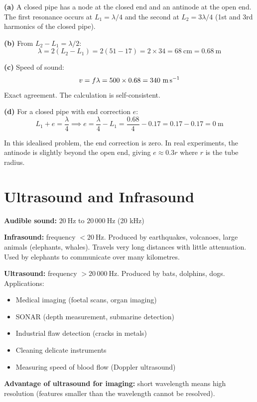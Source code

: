 \begin{solutionbox}
\textbf{(a)} A closed pipe has a node at the closed
end and an antinode at the open end. The first
resonance occurs at $L_1 = \lambda/4$ and the
second at $L_2 = 3\lambda/4$ (1st and 3rd harmonics
of the closed pipe).

\textbf{(b)} From $L_2 - L_1 = \lambda/2$:
\[
  \lambda = 2(L_2 - L_1) = 2(51 - 17)
  = 2 \times 34 = 68\ \text{cm} = 0.68\ \text{m}
\]

\textbf{(c)} Speed of sound:
\[
  v = f\lambda = 500 \times 0.68
  = 340\ \text{m\,s}^{-1}
\]
Exact agreement. The calculation is self-consistent.

\textbf{(d)} For a closed pipe with end correction $e$:
\[
  L_1 + e = \frac{\lambda}{4}
  \implies e = \frac{\lambda}{4} - L_1
  = \frac{0.68}{4} - 0.17 = 0.17 - 0.17 = 0\ \text{m}
\]

In this idealised problem, the end correction is zero.
In real experiments, the antinode is slightly beyond
the open end, giving $e \approx 0.3r$ where $r$ is
the tube radius.
\end{solutionbox}

\section{Ultrasound and Infrasound}

\begin{defbox}
\textbf{Audible sound:} $20\ \text{Hz}$
to $20\,000\ \text{Hz}$ (20 kHz)

\textbf{Infrasound:} frequency $< 20\ \text{Hz}$.
Produced by earthquakes, volcanoes, large animals
(elephants, whales). Travels very long distances
with little attenuation. Used by elephants to
communicate over many kilometres.

\textbf{Ultrasound:} frequency $> 20\,000\ \text{Hz}$.
Produced by bats, dolphins, dogs.
Applications:
\begin{itemize}[noitemsep]
  \item Medical imaging (foetal scans, organ imaging)
  \item SONAR (depth measurement, submarine detection)
  \item Industrial flaw detection (cracks in metals)
  \item Cleaning delicate instruments
  \item Measuring speed of blood flow (Doppler
  ultrasound)
\end{itemize}
\textbf{Advantage of ultrasound for imaging:} short
wavelength means high resolution (features smaller
than the wavelength cannot be resolved).
\end{defbox}

